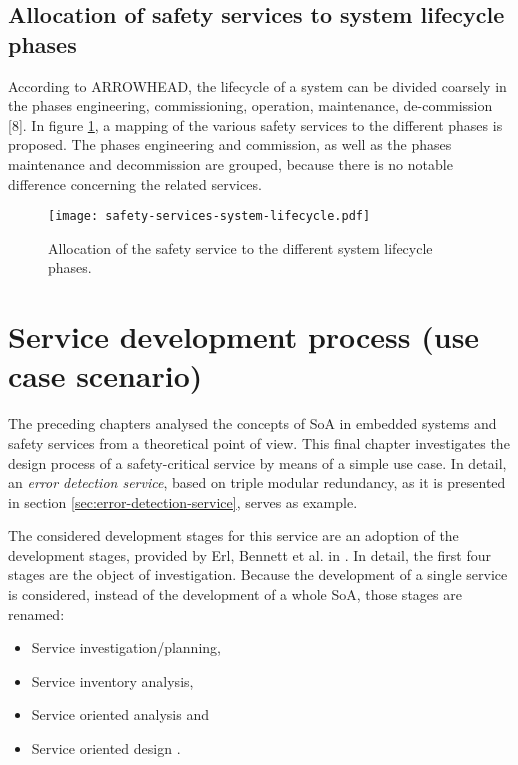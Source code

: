 \subsection{Allocation of safety services to system lifecycle phases}

According to ARROWHEAD, the lifecycle of a system can be divided coarsely in the phases engineering, commissioning, operation, maintenance, de-commission [8]. In figure \ref{fig:safety-services-system-lifecycle}, a mapping of the various safety services to the different phases is proposed. The phases engineering and commission, as well as the phases maintenance and decommission are grouped, because there is no notable difference concerning the related services.

\begin{figure}[!htbp]
\centering
\texttt{[image: safety-services-system-lifecycle.pdf]}
\label{fig:safety-services-system-lifecycle}
\caption{Allocation of the safety service to the different system lifecycle phases.}
\end{figure}







\section{Service development process (use case scenario)}
\label{sec:service-development-process}

The preceding chapters analysed the concepts of SoA in embedded systems and safety services from a theoretical point of view. This final chapter investigates the design process of a safety-critical service by means of a simple use case. In detail, an \emph{error detection service}, based on triple modular redundancy, as it is presented in section \ref{sec:error-detection-service}, serves as example.

The considered development stages for this service are an adoption of the development stages, provided by Erl, Bennett et al. in \cite[p.116]{erl2011}. In detail, the first four stages are the object of investigation. Because the development of a single service is considered, instead of the development of a whole SoA, those stages are renamed:
\begin{itemize}
\item Service investigation/planning,
\item Service inventory analysis,
\item Service oriented analysis and
\item Service oriented design \cite[p.116]{erl2011}.
\end{itemize}

